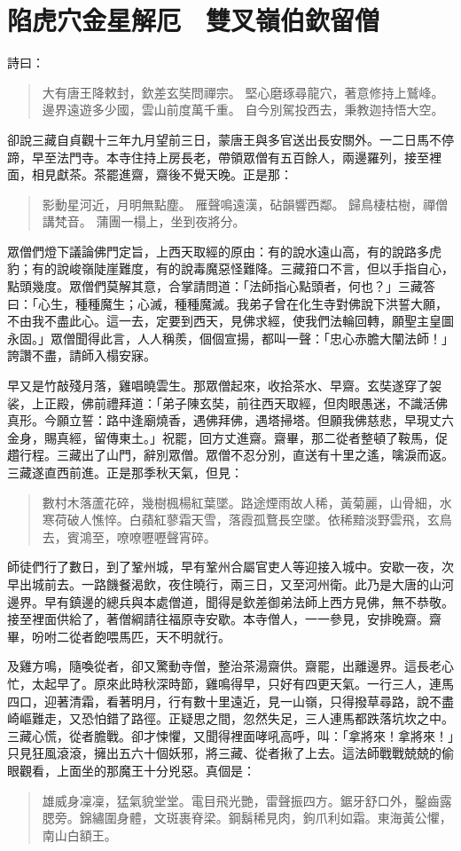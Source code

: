 
\chapter{陷虎穴金星解厄　雙叉嶺伯欽留僧}

詩曰：
\begin{quote}
大有唐王降敕封，欽差玄奘問禪宗。
堅心磨琢尋龍穴，著意修持上鷲峰。
邊界遠遊多少國，雲山前度萬千重。
自今別駕投西去，秉教迦持悟大空。
\end{quote}

卻說三藏自貞觀十三年九月望前三日，蒙唐王與多官送出長安關外。一二日馬不停蹄，早至法門寺。本寺住持上房長老，帶領眾僧有五百餘人，兩邊羅列，接至裡面，相見獻茶。茶罷進齋，齋後不覺天晚。正是那：
\begin{quote}
影動星河近，月明無點塵。
雁聲鳴遠漢，砧韻響西鄰。
歸鳥棲枯樹，禪僧講梵音。
蒲團一榻上，坐到夜將分。
\end{quote}

眾僧們燈下議論佛門定旨，上西天取經的原由：有的說水遠山高，有的說路多虎豹；有的說峻嶺陡崖難度，有的說毒魔惡怪難降。三藏箝口不言，但以手指自心，點頭幾度。眾僧們莫解其意，合掌請問道：「法師指心點頭者，何也？」三藏答曰：「心生，種種魔生；心滅，種種魔滅。我弟子曾在化生寺對佛說下洪誓大願，不由我不盡此心。這一去，定要到西天，見佛求經，使我們法輪回轉，願聖主皇圖永固。」眾僧聞得此言，人人稱羨，個個宣揚，都叫一聲：「忠心赤膽大闡法師！」誇讚不盡，請師入榻安寐。

早又是竹敲殘月落，雞唱曉雲生。那眾僧起來，收拾茶水、早齋。玄奘遂穿了袈裟，上正殿，佛前禮拜道：「弟子陳玄奘，前往西天取經，但肉眼愚迷，不識活佛真形。今願立誓：路中逢廟燒香，遇佛拜佛，遇塔掃塔。但願我佛慈悲，早現丈六金身，賜真經，留傳東土。」祝罷，回方丈進齋。齋畢，那二從者整頓了鞍馬，促趲行程。三藏出了山門，辭別眾僧。眾僧不忍分別，直送有十里之遙，噙淚而返。三藏遂直西前進。正是那季秋天氣，但見：
\begin{quote}
數村木落蘆花碎，幾樹楓楊紅葉墜。路途煙雨故人稀，黃菊麗，山骨細，水寒荷破人憔悴。白蘋紅蓼霜天雪，落霞孤鶩長空墜。依稀黯淡野雲飛，玄鳥去，賓鴻至，嘹嘹嚦嚦聲宵碎。
\end{quote}

師徒們行了數日，到了鞏州城，早有鞏州合屬官吏人等迎接入城中。安歇一夜，次早出城前去。一路饑餐渴飲，夜住曉行，兩三日，又至河州衛。此乃是大唐的山河邊界。早有鎮邊的總兵與本處僧道，聞得是欽差御弟法師上西方見佛，無不恭敬。接至裡面供給了，著僧綱請往福原寺安歇。本寺僧人，一一參見，安排晚齋。齋畢，吩咐二從者飽喂馬匹，天不明就行。

及雞方鳴，隨喚從者，卻又驚動寺僧，整治茶湯齋供。齋罷，出離邊界。這長老心忙，太起早了。原來此時秋深時節，雞鳴得早，只好有四更天氣。一行三人，連馬四口，迎著清霜，看著明月，行有數十里遠近，見一山嶺，只得撥草尋路，說不盡崎嶇難走，又恐怕錯了路徑。正疑思之間，忽然失足，三人連馬都跌落坑坎之中。三藏心慌，從者膽戰。卻才悚懼，又聞得裡面哮吼高呼，叫：「拿將來！拿將來！」只見狂風滾滾，擁出五六十個妖邪，將三藏、從者揪了上去。這法師戰戰兢兢的偷眼觀看，上面坐的那魔王十分兇惡。真個是：
\begin{quote}
雄威身凜凜，猛氣貌堂堂。電目飛光艷，雷聲振四方。鋸牙舒口外，鑿齒露腮旁。錦繡圍身體，文斑裹脊梁。鋼鬍稀見肉，鉤爪利如霜。東海黃公懼，南山白額王。
\end{quote}

